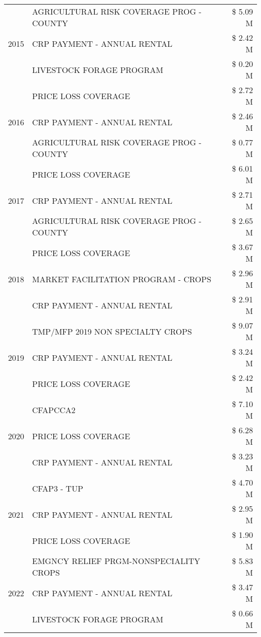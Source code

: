 \begin{tabular}{llr}
\cline{1-3}
\multirow[t]{3}{*}{2015} & AGRICULTURAL RISK COVERAGE PROG - COUNTY & \$ 5.09 M \\
 & CRP PAYMENT - ANNUAL RENTAL & \$ 2.42 M \\
 & LIVESTOCK FORAGE PROGRAM & \$ 0.20 M \\
\cline{1-3}
\multirow[t]{3}{*}{2016} & PRICE LOSS COVERAGE & \$ 2.72 M \\
 & CRP PAYMENT - ANNUAL RENTAL & \$ 2.46 M \\
 & AGRICULTURAL RISK COVERAGE PROG - COUNTY & \$ 0.77 M \\
\cline{1-3}
\multirow[t]{3}{*}{2017} & PRICE LOSS COVERAGE & \$ 6.01 M \\
 & CRP PAYMENT - ANNUAL RENTAL & \$ 2.71 M \\
 & AGRICULTURAL RISK COVERAGE PROG - COUNTY & \$ 2.65 M \\
\cline{1-3}
\multirow[t]{3}{*}{2018} & PRICE LOSS COVERAGE & \$ 3.67 M \\
 & MARKET FACILITATION PROGRAM - CROPS & \$ 2.96 M \\
 & CRP PAYMENT - ANNUAL RENTAL & \$ 2.91 M \\
\cline{1-3}
\multirow[t]{3}{*}{2019} & TMP/MFP 2019 NON SPECIALTY CROPS & \$ 9.07 M \\
 & CRP PAYMENT - ANNUAL RENTAL & \$ 3.24 M \\
 & PRICE LOSS COVERAGE & \$ 2.42 M \\
\cline{1-3}
\multirow[t]{3}{*}{2020} & CFAPCCA2 & \$ 7.10 M \\
 & PRICE LOSS COVERAGE & \$ 6.28 M \\
 & CRP PAYMENT - ANNUAL RENTAL & \$ 3.23 M \\
\cline{1-3}
\multirow[t]{3}{*}{2021} & CFAP3 - TUP & \$ 4.70 M \\
 & CRP PAYMENT - ANNUAL RENTAL & \$ 2.95 M \\
 & PRICE LOSS COVERAGE & \$ 1.90 M \\
\cline{1-3}
\multirow[t]{3}{*}{2022} & EMGNCY RELIEF PRGM-NONSPECIALITY CROPS & \$ 5.83 M \\
 & CRP PAYMENT - ANNUAL RENTAL & \$ 3.47 M \\
 & LIVESTOCK FORAGE PROGRAM & \$ 0.66 M \\
\cline{1-3}
\bottomrule
\end{tabular}
